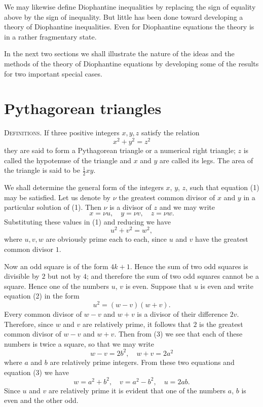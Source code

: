 \documentclass[oneside]{book}
\begin{document}
We may likewise define Diophantine inequalities by replacing the
sign of equality above by the sign of inequality. But little has
been done toward developing a theory of Diophantine inequalities.
Even for Diophantine equations the theory is in a rather fragmentary
state.

In the next two sections we shall illustrate the nature of the ideas
and the methods of the theory of Diophantine equations by developing
some of the results for two important special cases.

\section{Pythagorean triangles}\label{s46}%

\textsc{Definitions.} If three positive integers $x, y, z$ satisfy
the relation
\begin{equation}
x^2 + y^2 = z^2 \tag{1}
\end{equation}
they are said to form a Pythagorean triangle or a numerical right
triangle; $z$ is called the hypotenuse of the triangle and $x$ and
$y$ are called its legs. The area of the triangle is said to be
$\frac{1}{2} xy$.

We shall determine the general form of the integers $x$, $y$, $z$,
such that equation (1) may be satisfied. Let us denote by $\nu$ the
greatest common divisor of $x$ and $y$ in a particular solution of
(1). Then $\nu$ is a divisor of $z$ and we may write
\begin{equation*}
x = \nu u, \quad y = \nu v,\quad  z = \nu w.
\end{equation*}
Substituting these values in (1) and reducing we have
\begin{equation}
u^2 + v^2 = w^2, \tag{2}
\end{equation}
where $u, v, w$ are obviously prime each to each, since $u$ and $v$
have the greatest common divisor $1$.

Now an odd square is of the form $4k + 1$. Hence the sum of two odd
squares is divisible by $2$ but not by $4$; and therefore the sum of
two odd squares cannot be a square. Hence one of the numbers $u$,
$v$ is even. Suppose that $u$ is even and write equation (2) in the
form
\begin{equation}
u^2 = (w - v)(w + v). \tag{3}
\end{equation}
Every common divisor of $w - v$ and $w + v$ is a divisor of their
difference $2v$. Therefore, since $w$ and $v$ are relatively prime,
it follows that $2$ is the greatest common divisor of $w - v$ and $w
+ v$. Then from (3) we see that each of these numbers is twice a
square, so that we may write
\begin{equation*}
w - v = 2b^2,\quad w + v = 2a^2
\end{equation*}
where $a$ and $b$ are relatively prime integers. From these two
equations and equation (3) we have
\begin{equation}
w = a^2 + b^2, \quad v = a^2 -b^2,\quad u = 2ab. \tag{4}
\end{equation}
Since $u$ and $v$ are relatively prime it is evident that one of the
numbers $a$, $b$ is even and the other odd.
\end{document}
